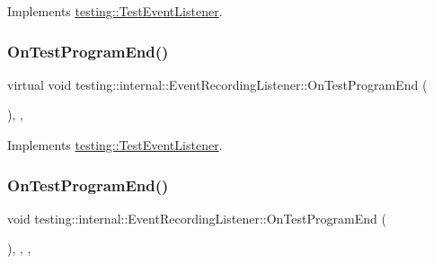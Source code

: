 Implements \mbox{\hyperlink{classtesting_1_1_test_event_listener_a054f8705c883fa120b91473aff38f2ee}{testing\+::\+Test\+Event\+Listener}}.

\mbox{\label{classtesting_1_1internal_1_1_event_recording_listener_a21fe9c3c519c4599a48b16ddfb734aa3}} 
\subsubsection{\texorpdfstring{OnTestProgramEnd()}{OnTestProgramEnd()}\hspace{0.1cm}{\footnotesize\ttfamily [1/3]}}
{\footnotesize\ttfamily virtual void testing\+::internal\+::\+Event\+Recording\+Listener\+::\+On\+Test\+Program\+End (\begin{DoxyParamCaption}\item[{const \mbox{\hyperlink{classtesting_1_1_unit_test}{Unit\+Test}} \&}]{ }\end{DoxyParamCaption})\hspace{0.3cm}{\ttfamily [inline]}, {\ttfamily [protected]}, {\ttfamily [virtual]}}



Implements \mbox{\hyperlink{classtesting_1_1_test_event_listener_ad15b6246d94c268e233487a86463ef3d}{testing\+::\+Test\+Event\+Listener}}.

\mbox{\label{classtesting_1_1internal_1_1_event_recording_listener_a22952f706a15c028d4b43256602035bb}} 
\subsubsection{\texorpdfstring{OnTestProgramEnd()}{OnTestProgramEnd()}\hspace{0.1cm}{\footnotesize\ttfamily [2/3]}}
{\footnotesize\ttfamily void testing\+::internal\+::\+Event\+Recording\+Listener\+::\+On\+Test\+Program\+End (\begin{DoxyParamCaption}\item[{const \mbox{\hyperlink{classtesting_1_1_unit_test}{Unit\+Test}} \&}]{ }\end{DoxyParamCaption})\hspace{0.3cm}{\ttfamily [inline]}, {\ttfamily [override]}, {\ttfamily [protected]}, {\ttfamily [virtual]}}



